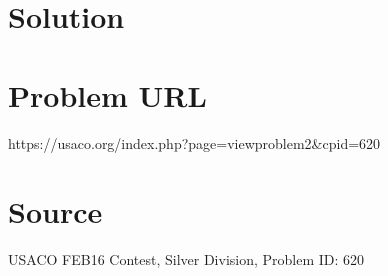 \documentclass[12pt]{article}
\begin{document}
\section*{Solution}


\section*{Problem URL}
https://usaco.org/index.php?page=viewproblem2&cpid=620

\section*{Source}
USACO FEB16 Contest, Silver Division, Problem ID: 620
\end{document}
